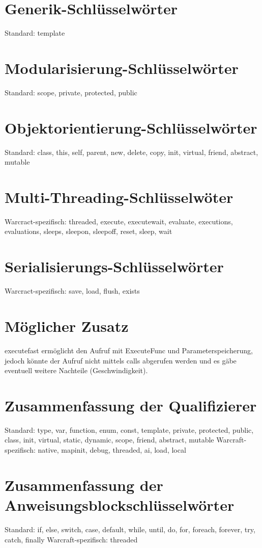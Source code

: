 \section{Generik-Schlüsselwörter}
Standard: template

\section{Modularisierung-Schlüsselwörter}
Standard: scope, private, protected, public

\section{Objektorientierung-Schlüsselwörter}
Standard: class, this, self, parent, new, delete, copy, init, virtual, friend, abstract, mutable

\section{Multi-Threading-Schlüsselwöter}
Warcract-spezifisch: threaded, execute, executewait, evaluate, executions, evaluations, sleeps, sleepon, sleepoff, reset, sleep, wait

\section{Serialisierungs-Schlüsselwörter}
Warcract-spezifisch: save, load, flush, exists

\section{Möglicher Zusatz}
executefast ermöglicht den Aufruf mit ExecuteFunc und Parameterspeicherung, jedoch könnte
der Aufruf nicht mittels calls abgerufen werden und es gäbe eventuell weitere Nachteile
(Geschwindigkeit).

\section{Zusammenfassung der Qualifizierer}
Standard: type, var, function, enum, const, template, private, protected, public, class, init, virtual, static, dynamic, scope, friend, abstract, mutable
Warcraft-spezifisch: native, mapinit, debug, threaded, ai, load, local

\section{Zusammenfassung der Anweisungsblockschlüsselwörter}
Standard: if, else, switch, case, default, while, until, do, for, foreach, forever, try, catch, finally
Warcraft-spezifisch: threaded

